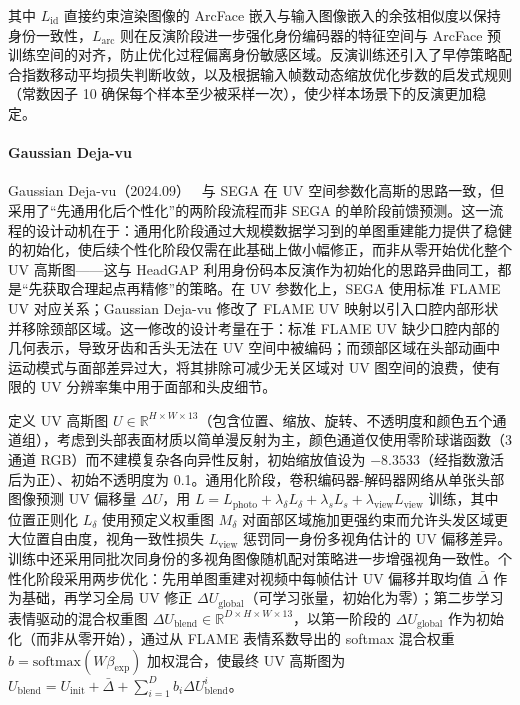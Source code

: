 其中 $L_{\text{id}}$ 直接约束渲染图像的 ArcFace 嵌入与输入图像嵌入的余弦相似度以保持身份一致性，$L_{\text{arc}}$ 则在反演阶段进一步强化身份编码器的特征空间与 ArcFace 预训练空间的对齐，防止优化过程偏离身份敏感区域。反演训练还引入了早停策略配合指数移动平均损失判断收敛，以及根据输入帧数动态缩放优化步数的启发式规则（常数因子 10 确保每个样本至少被采样一次），使少样本场景下的反演更加稳定。

\paragraph{Gaussian Deja-vu}

Gaussian Deja-vu（2024.09）~\cite{2409_16147} 与 SEGA 在 UV 空间参数化高斯的思路一致，但采用了``先通用化后个性化''的两阶段流程而非 SEGA 的单阶段前馈预测。这一流程的设计动机在于：通用化阶段通过大规模数据学习到的单图重建能力提供了稳健的初始化，使后续个性化阶段仅需在此基础上做小幅修正，而非从零开始优化整个 UV 高斯图——这与 HeadGAP 利用身份码本反演作为初始化的思路异曲同工，都是``先获取合理起点再精修''的策略。在 UV 参数化上，SEGA 使用标准 FLAME UV 对应关系；Gaussian Deja-vu 修改了 FLAME UV 映射以引入口腔内部形状并移除颈部区域。这一修改的设计考量在于：标准 FLAME UV 缺少口腔内部的几何表示，导致牙齿和舌头无法在 UV 空间中被编码；而颈部区域在头部动画中运动模式与面部差异过大，将其排除可减少无关区域对 UV 图空间的浪费，使有限的 UV 分辨率集中用于面部和头皮细节。

定义 UV 高斯图 $U \in \mathbb{R}^{H \times W \times 13}$（包含位置、缩放、旋转、不透明度和颜色五个通道组），考虑到头部表面材质以简单漫反射为主，颜色通道仅使用零阶球谐函数（3 通道 RGB）而不建模复杂各向异性反射，初始缩放值设为 $-8.3533$（经指数激活后为正）、初始不透明度为 0.1。通用化阶段，卷积编码器-解码器网络从单张头部图像预测 UV 偏移量 $\Delta U$，用 $L = L_{\text{photo}} + \lambda_\delta L_\delta + \lambda_s L_s + \lambda_{\text{view}} L_{\text{view}}$ 训练，其中位置正则化 $L_\delta$ 使用预定义权重图 $M_\delta$ 对面部区域施加更强约束而允许头发区域更大位置自由度，视角一致性损失 $L_{\text{view}}$ 惩罚同一身份多视角估计的 UV 偏移差异。训练中还采用同批次同身份的多视角图像随机配对策略进一步增强视角一致性。个性化阶段采用两步优化：先用单图重建对视频中每帧估计 UV 偏移并取均值 $\bar{\Delta}$ 作为基础，再学习全局 UV 修正 $\Delta U_{\text{global}}$（可学习张量，初始化为零）；第二步学习表情驱动的混合权重图 $\Delta U_{\text{blend}} \in \mathbb{R}^{D \times H \times W \times 13}$，以第一阶段的 $\Delta U_{\text{global}}$ 作为初始化（而非从零开始），通过从 FLAME 表情系数导出的 softmax 混合权重 $b = \text{softmax}(W \beta_{\text{exp}})$ 加权混合，使最终 UV 高斯图为 $U_{\text{blend}} = U_{\text{init}} + \bar{\Delta} + \sum_{i=1}^D b_i \Delta U_{\text{blend}}^i$。

